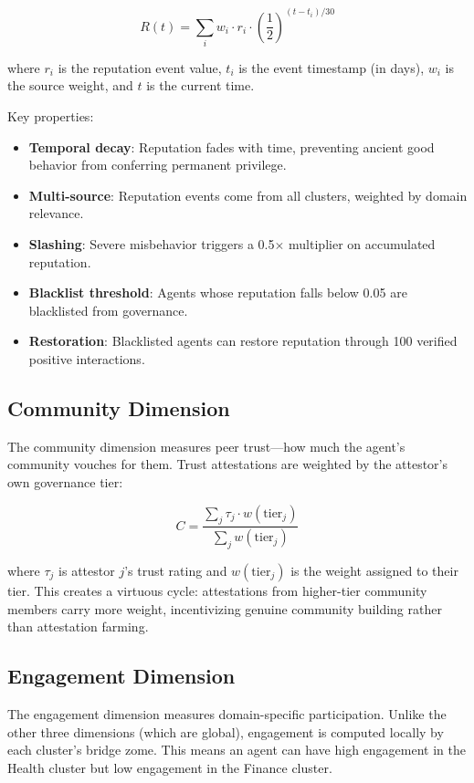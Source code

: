 \documentclass[12pt]{book}
\begin{document}
\begin{equation}
  R(t) = \sum_{i} w_i \cdot r_i \cdot \left(\frac{1}{2}\right)^{(t - t_i) / 30}
\end{equation}

where $r_i$ is the reputation event value, $t_i$ is the event timestamp (in days),
$w_i$ is the source weight, and $t$ is the current time.

Key properties:
\begin{itemize}
  \item \textbf{Temporal decay}: Reputation fades with time, preventing ancient
    good behavior from conferring permanent privilege.
  \item \textbf{Multi-source}: Reputation events come from all clusters, weighted
    by domain relevance.
  \item \textbf{Slashing}: Severe misbehavior triggers a 0.5$\times$ multiplier
    on accumulated reputation.
  \item \textbf{Blacklist threshold}: Agents whose reputation falls below 0.05
    are blacklisted from governance.
  \item \textbf{Restoration}: Blacklisted agents can restore reputation through
    100 verified positive interactions.
\end{itemize}

\subsection{Community Dimension}

The community dimension measures peer trust---how much the agent's community
vouches for them. Trust attestations are weighted by the attestor's own
governance tier:

\begin{equation}
  C = \frac{\sum_{j} \tau_j \cdot w(\text{tier}_j)}{\sum_{j} w(\text{tier}_j)}
\end{equation}

where $\tau_j$ is attestor $j$'s trust rating and $w(\text{tier}_j)$ is the
weight assigned to their tier. This creates a virtuous cycle: attestations
from higher-tier community members carry more weight, incentivizing genuine
community building rather than attestation farming.

\subsection{Engagement Dimension}

The engagement dimension measures domain-specific participation. Unlike the
other three dimensions (which are global), engagement is computed locally
by each cluster's bridge zome. This means an agent can have high engagement
in the Health cluster but low engagement in the Finance cluster.
\end{document}
